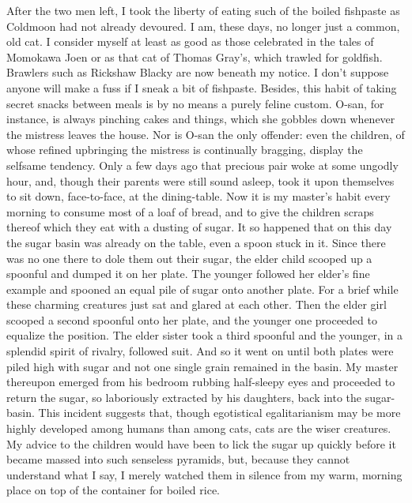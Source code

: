 \documentclass{book}
\begin{document}
After the two men left, I took the liberty of eating such of the boiled
fishpaste as Coldmoon had not already devoured. I am, these days, no
longer just a common, old cat. I consider myself at least as good as
those celebrated in the tales of Momokawa Joen or as that cat of Thomas
Gray's, which trawled for goldfish. Brawlers such as Rickshaw Blacky are
now beneath my notice. I don't suppose anyone will make a fuss if I
sneak a bit of fishpaste. Besides, this habit of taking secret snacks
between meals is by no means a purely feline custom. O-san, for
instance, is always pinching cakes and things, which she gobbles down
whenever the mistress leaves the house. Nor is O-san the only offender:
even the children, of whose refined upbringing the mistress is
continually bragging, display the selfsame tendency. Only a few days ago
that precious pair woke at some ungodly hour, and, though their parents
were still sound asleep, took it upon themselves to sit down,
face-to-face, at the dining-table. Now it is my master's habit every
morning to consume most of a loaf of bread, and to give the children
scraps thereof which they eat with a dusting of sugar. It so happened
that on this day the sugar basin was already on the table, even a spoon
stuck in it. Since there was no one there to dole them out their sugar,
the elder child scooped up a spoonful and dumped it on her plate. The
younger followed her elder's fine example and spooned an equal pile of
sugar onto another plate. For a brief while these charming creatures
just sat and glared at each other. Then the elder girl scooped a second
spoonful onto her plate, and the younger one proceeded to equalize the
position. The elder sister took a third spoonful and the younger, in a
splendid spirit of rivalry, followed suit. And so it went on until both
plates were piled high with sugar and not one single grain remained in
the basin. My master thereupon emerged from his bedroom rubbing
half-sleepy eyes and proceeded to return the sugar, so laboriously
extracted by his daughters, back into the sugar-basin. This incident
suggests that, though egotistical egalitarianism may be more highly
developed among humans than among cats, cats are the wiser creatures. My
advice to the children would have been to lick the sugar up quickly
before it became massed into such senseless pyramids, but, because they
cannot understand what I say, I merely watched them in silence from my
warm, morning place on top of the container for boiled rice.
\end{document}
